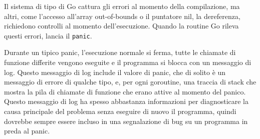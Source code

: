 Il sistema di tipo di Go cattura gli errori al momento della compilazione, ma altri, come l'accesso all'array out-of-bounds o il puntatore nil, la dereferenza, richiedono controlli al momento dell'esecuzione.
Quando la routine Go rileva questi errori, lancia il \verb|panic|.

Durante un tipico panic, l'esecuzione normale si ferma, tutte le chiamate di funzione differite vengono eseguite e il programma si blocca con un messaggio di log.
Questo messaggio di log include il valore di panic, che di solito è un messaggio di errore di qualche tipo, e, per ogni goroutine, una traccia di stack che mostra la pila di chiamate di funzione che erano attive al momento del panico.
Questo messaggio di log ha spesso abbastanza informazioni per diagnosticare la causa principale del problema senza eseguire di nuovo il programma, quindi dovrebbe sempre essere incluso in una segnalazione di bug su un programma in preda al panic.
